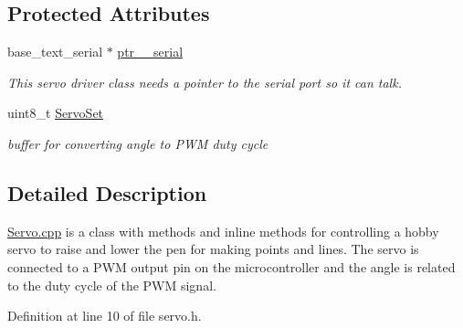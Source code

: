 \subsection*{Protected Attributes}
\begin{DoxyCompactItemize}
\item 
\hypertarget{classservo_af0e4b202a4463029ce78ed775985ef46}{base\-\_\-text\-\_\-serial $\ast$ \hyperlink{classservo_af0e4b202a4463029ce78ed775985ef46}{ptr\-\_\-\_\-serial}}\label{classservo_af0e4b202a4463029ce78ed775985ef46}

\begin{DoxyCompactList}\small\item\em This servo driver class needs a pointer to the serial port so it can talk. \end{DoxyCompactList}\item 
\hypertarget{classservo_a9ba9dab8211cd41e05b3ec233fdf27d7}{uint8\-\_\-t \hyperlink{classservo_a9ba9dab8211cd41e05b3ec233fdf27d7}{Servo\-Set}}\label{classservo_a9ba9dab8211cd41e05b3ec233fdf27d7}

\begin{DoxyCompactList}\small\item\em buffer for converting angle to P\-W\-M duty cycle \end{DoxyCompactList}\end{DoxyCompactItemize}


\subsection{Detailed Description}
\hyperlink{servo_8cpp_source}{Servo.\-cpp} is a class with methods and inline methods for controlling a hobby servo to raise and lower the pen for making points and lines. The servo is connected to a P\-W\-M output pin on the microcontroller and the angle is related to the duty cycle of the P\-W\-M signal. 

Definition at line 10 of file servo.\-h.



